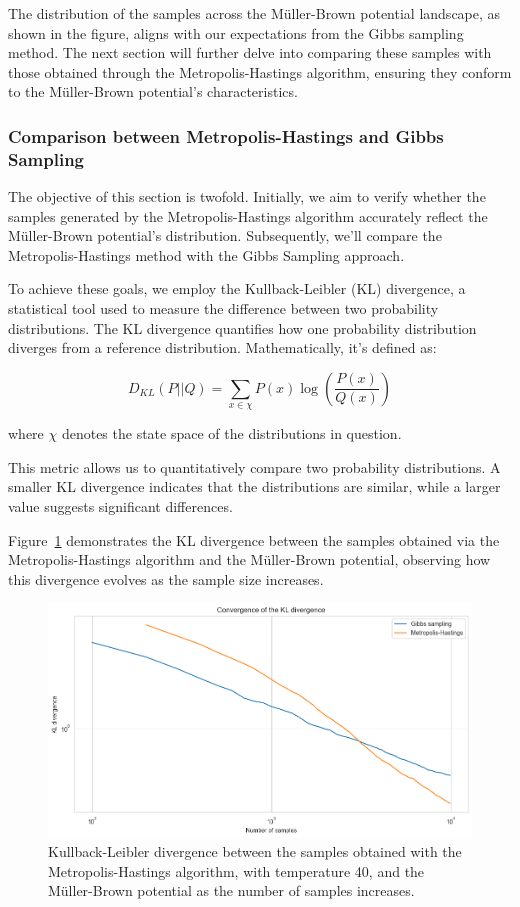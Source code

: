 \documentclass{report}
\begin{document}
The distribution of the samples across the Müller-Brown potential landscape, as shown in the figure, aligns with our expectations from the Gibbs sampling method. The next section will further delve into comparing these samples with those obtained through the Metropolis-Hastings algorithm, ensuring they conform to the Müller-Brown potential's characteristics.

\subsubsection{Comparison between Metropolis-Hastings and Gibbs Sampling}
\label{sec:comparison_metropolis_gibbs}

The objective of this section is twofold. Initially, we aim to verify whether the samples generated by the Metropolis-Hastings algorithm accurately reflect the Müller-Brown potential's distribution. Subsequently, we'll compare the Metropolis-Hastings method with the Gibbs Sampling approach.

To achieve these goals, we employ the Kullback-Leibler (KL) divergence, a statistical tool used to measure the difference between two probability distributions. The KL divergence quantifies how one probability distribution diverges from a reference distribution. Mathematically, it's defined as:

\[
	D_{KL}(P||Q) = \sum_{x \in \chi} P(x) \log \left( \frac{P(x)}{Q(x)} \right)
\]

where \(\chi\) denotes the state space of the distributions in question.

This metric allows us to quantitatively compare two probability distributions. A smaller KL divergence indicates that the distributions are similar, while a larger value suggests significant differences.


Figure~\ref{fig:klmh} demonstrates the KL divergence between the samples obtained via the Metropolis-Hastings algorithm and the Müller-Brown potential, observing how this divergence evolves as the sample size increases.

\begin{figure}[H]
	\centering
	\includegraphics[width=0.5\linewidth]{./Figures/MCMC/klmh.png}
	\caption{Kullback-Leibler divergence between the samples obtained with the Metropolis-Hastings algorithm, with temperature 40, and the Müller-Brown potential as the number of samples increases.}
	\label{fig:klmh}
\end{figure}
\end{document}
